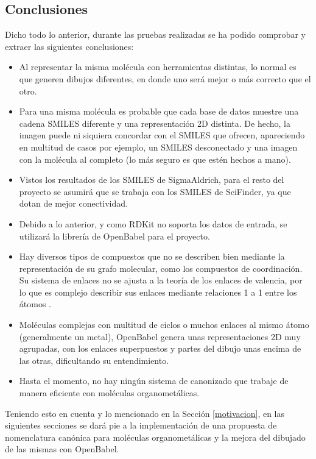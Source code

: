 \subsection{Conclusiones}
Dicho todo lo anterior, durante las pruebas realizadas se ha podido comprobar y extraer las siguientes conclusiones:

\begin{itemize}
    \item Al representar la misma molécula con herramientas distintas, lo normal es que generen dibujos diferentes, en donde uno será mejor o más correcto que el otro.
    \item Para una misma molécula es probable que cada base de datos muestre una cadena SMILES diferente y una representación 2D distinta. De hecho, la imagen puede ni siquiera concordar con el SMILES que ofrecen, apareciendo en multitud de casos por ejemplo, un SMILES desconectado y una imagen con la molécula al completo (lo más seguro es que estén hechos a mano).
    \item Vistos los resultados de los SMILES de SigmaAldrich, para el resto del proyecto se asumirá que se trabaja con los SMILES de SciFinder, ya que dotan de mejor conectividad. 
    \item Debido a lo anterior, y como RDKit no soporta los datos de entrada, se utilizará la librería de OpenBabel para el proyecto.
    \item Hay diversos tipos de compuestos que no se describen bien mediante la representación de su grafo molecular, como los compuestos de coordinación. Su sistema de enlaces no se ajusta a la teoría de los enlaces de valencia, por lo que es complejo describir sus enlaces mediante relaciones 1 a 1 entre los átomos \cite{david_molecular_2020}.
    \item Moléculas complejas con multitud de ciclos o muchos enlaces al mismo átomo (generalmente un metal), OpenBabel genera unas representaciones 2D muy agrupadas, con los enlaces superpuestos y partes del dibujo unas encima de las otras, dificultando su entendimiento.
    \item Hasta el momento, no hay ningún sistema de canonizado que trabaje de manera eficiente con moléculas organometálicas.
    
\end{itemize}


Teniendo esto en cuenta y lo mencionado en la Sección \ref{motivacion}, en las siguientes secciones se dará pie a la implementación de una propuesta de nomenclatura canónica para moléculas organometálicas y la mejora del dibujado de las mismas con OpenBabel.





